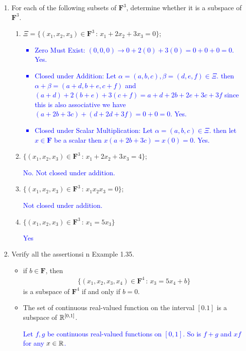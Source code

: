 \documentclass[10pt,a4paper]{report}
\newcommand{\BLUE}[1]{\textcolor{blue}{#1}}
\newcommand{\F}{\textbf{F}}
\begin{document}
\begin{enumerate}

\item For each of the following subsets of $\F^3$, determine whether it is a subspace of $\F^3$.
\begin{enumerate}
	\item $\Xi=\{(x_1,x_2,x_3)\in\F^3\,:\, x_1+2x_2+3x_3=0\}$;
	
	\BLUE{\begin{itemize}
		\item Zero Must Exist:  $(0,0,0) \to 0+2(0)+3(0)=0+0+0=0$.  Yes.
		\item Closed under Addition: Let $\alpha=(a,b,c), \beta=(d,e,f) \in \Xi$. then $\alpha+\beta = (a+d,b+e, c+f)$ and $(a+d)+2(b+e)+3(c+f) = a+d+2b+2e+3c+3f$ since this is also associative we have $(a+2b+3c)+(d+2d+3f)=0+0=0$.  Yes.
		\item Closed under Scalar Multiplication: Let $\alpha=(a,b,c) \in \Xi$.  then let $x\in \F$ be a scalar then $x(a+2b+3c) = x(0) = 0$.  Yes.
	\end{itemize}
	}	
	
	\item $\{(x_1,x_2,x_3)\in\F^3\,:\,x_1+2x_2+3x_3=4\}$;
	
	\BLUE{No.  Not closed under addition.}
	
	\item $\{(x_1,x_2,x_3)\in\F^3\,:\,x_1x_2x_3=0\}$;
	
	\BLUE{ Not closed under addition.}
	
	\item $\{(x_1,x_2,x_3)\in\F^3\,:\, x_1=5x_3\}$
	
	\BLUE{Yes}
	
\end{enumerate}

\item Verify all the assertionsi n Example 1.35.

\begin{itemize}
	\item  if $b\in\F$, then 
	\begin{align*}
		\{(x_1,x_2,x_3,x_4)\in\F^4\,:\, x_3=5x_4+b\}
	\end{align*}is a subspace of $\F^4$ if and only if $b=0$.
	
	\item The set of continuous real-valued function on the interval $[0.1]$ is a subspace of $\mathbb{R}^{[0,1]}$.
	
	\BLUE{Let $f,g$ be continuous real-valued functions on $[0,1]$.  So is $f+g$ and $xf$ for any $x\in \mathbb{R}$.
	}
	

\end{itemize}
\end{enumerate}
\end{document}
